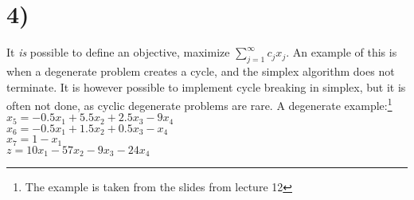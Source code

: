 \section*{4)}
It \textit{is} possible to define an objective, maximize $\sum_{j=1}^{\infty} c_j x_j$. An example of this is when a degenerate problem creates a cycle, and the simplex algorithm does not terminate. It is however possible to implement cycle breaking in simplex, but it is often not done, as cyclic degenerate problems are rare. A degenerate example:\footnote{The example is taken from the slides from lecture 12}\\

\noindent
$x_5 = -0.5x_1 + 5.5x_2 + 2.5x_3 - 9x_4$\\ 
$x_6 = -0.5x_1 + 1.5x_2 + 0.5x_3 - x_4$\\
$x_7 = 1 - x_1$\\
$z = 10x_1 - 57x_2 - 9x_3 - 24x_4$


